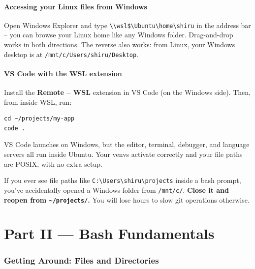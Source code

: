 \documentclass[11pt,a4paper]{article}
\begin{document}
\subsection*{Accessing your Linux files from Windows}

Open Windows Explorer and type \texttt{\textbackslash{}\textbackslash{}wsl\$\textbackslash{}Ubuntu\textbackslash{}home\textbackslash{}shiru}
in the address bar -- you can browse your Linux home like any
Windows folder. Drag-and-drop works in both directions. The reverse
also works: from Linux, your Windows desktop is at
\texttt{/mnt/c/Users/shiru/Desktop}.

\subsection*{VS Code with the WSL extension}

Install the \textbf{Remote -- WSL} extension in VS Code (on the
Windows side). Then, from inside WSL, run:

\begin{lstlisting}[style=bashstyle]
cd ~/projects/my-app
code .
\end{lstlisting}

VS Code launches on Windows, but the editor, terminal, debugger,
and language servers all run inside Ubuntu. Your venvs activate
correctly and your file paths are POSIX, with no extra setup.

\begin{gotcha}
If you ever see file paths like \texttt{C:\textbackslash{}Users\textbackslash{}shiru\textbackslash{}projects}
inside a bash prompt, you've accidentally opened a Windows folder
from \texttt{/mnt/c/}. \textbf{Close it and reopen from
\texttt{\textasciitilde{}/projects/}.} You will lose hours to slow
git operations otherwise.
\end{gotcha}

\clearpage
\part*{Part II --- Bash Fundamentals}

\section{Getting Around: Files and Directories}
\end{document}
